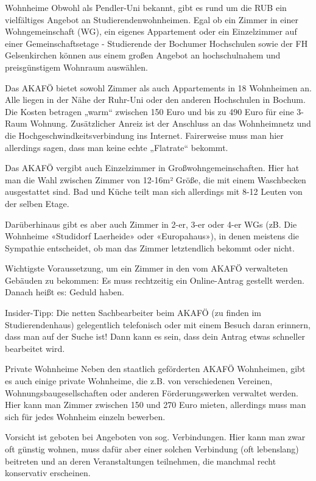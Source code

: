 Wohnheime
Obwohl als Pendler-Uni bekannt, gibt es rund um die RUB ein vielfältiges Angebot an Studierendenwohnheimen. Egal ob ein Zimmer in einer Wohngemeinschaft (WG), ein eigenes Appartement oder ein Einzelzimmer auf einer Gemeinschaftsetage - Studierende der Bochumer Hochschulen sowie der FH Gelsenkirchen können aus einem großen Angebot an hochschulnahem und preisgünstigem Wohnraum auswählen.

Das AKAFÖ bietet sowohl Zimmer als auch Appartements in 18 Wohnheimen an. Alle liegen in der Nähe der Ruhr-Uni oder den anderen Hochschulen in Bochum. Die Kosten betragen „warm“ zwischen 150 Euro und bis zu 490 Euro für eine 3-Raum Wohnung. Zusätzlicher Anreiz ist der Anschluss an das Wohnheimnetz und die Hochgeschwindkeitsverbindung ins Internet. Fairerweise muss man hier allerdings sagen, dass man keine echte „Flatrate“ bekommt.

Das AKAFÖ vergibt auch Einzelzimmer in Großwohngemeinschaften. Hier hat man die Wahl zwischen Zimmer von 12-16m² Größe, die mit einem Waschbecken ausgestattet sind. Bad und Küche teilt man sich allerdings mit 8-12 Leuten von der selben Etage.

Darüberhinaus gibt es aber auch Zimmer in 2-er, 3-er oder 4-er WGs (zB. Die Wohnheime «Studidorf Laerheide» oder «Europahaus»), in denen meistens die Sympathie entscheidet, ob man das Zimmer letztendlich bekommt oder nicht.

Wichtigste Voraussetzung, um ein Zimmer in den vom AKAFÖ verwalteten Gebäuden zu bekommen: Es muss rechtzeitig ein Online-Antrag gestellt werden. Danach heißt es: Geduld haben.

Insider-Tipp: Die netten Sachbearbeiter beim AKAFÖ (zu finden im Studierendenhaus) gelegentlich telefonisch oder mit einem Besuch daran erinnern, dass man auf der Suche ist! Dann kann es sein, dass dein Antrag etwas schneller bearbeitet wird.

Private Wohnheime
Neben den staatlich geförderten AKAFÖ Wohnheimen, gibt es auch einige private Wohnheime, die z.B. von verschiedenen Vereinen, Wohnungsbaugesellschaften oder anderen Förderungswerken verwaltet werden. Hier kann man Zimmer zwischen 150 und 270 Euro mieten, allerdings muss man sich für jedes Wohnheim einzeln bewerben.

Vorsicht ist geboten bei Angeboten von sog. Verbindungen. Hier kann man zwar oft günstig wohnen, muss dafür aber einer solchen Verbindung (oft lebenslang) beitreten und an deren Veranstaltungen teilnehmen, die manchmal recht konservativ erscheinen.

